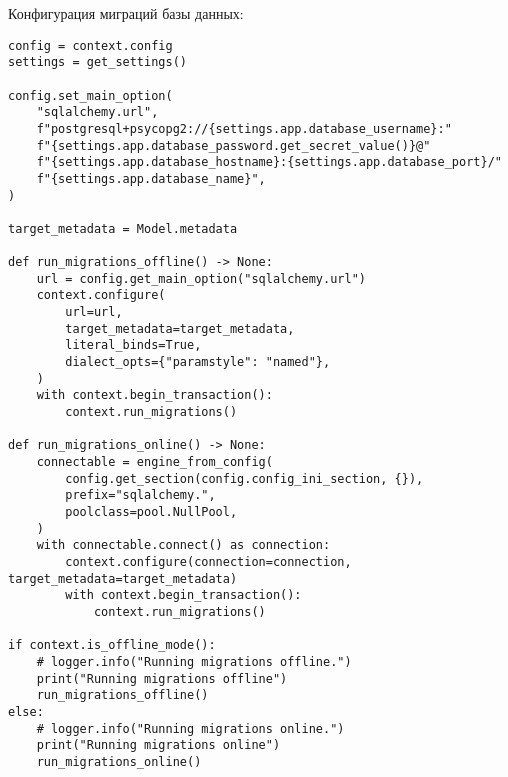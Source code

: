 \noindent
Конфигурация миграций базы данных:

\begin{lstlisting}[style=pythonstyle]
config = context.config
settings = get_settings()

config.set_main_option(
    "sqlalchemy.url",
    f"postgresql+psycopg2://{settings.app.database_username}:"
    f"{settings.app.database_password.get_secret_value()}@"
    f"{settings.app.database_hostname}:{settings.app.database_port}/"
    f"{settings.app.database_name}",
)

target_metadata = Model.metadata

def run_migrations_offline() -> None:
    url = config.get_main_option("sqlalchemy.url")
    context.configure(
        url=url,
        target_metadata=target_metadata,
        literal_binds=True,
        dialect_opts={"paramstyle": "named"},
    )
    with context.begin_transaction():
        context.run_migrations()

def run_migrations_online() -> None:
    connectable = engine_from_config(
        config.get_section(config.config_ini_section, {}),
        prefix="sqlalchemy.",
        poolclass=pool.NullPool,
    )
    with connectable.connect() as connection:
        context.configure(connection=connection, target_metadata=target_metadata)
        with context.begin_transaction():
            context.run_migrations()

if context.is_offline_mode():
    # logger.info("Running migrations offline.")
    print("Running migrations offline")
    run_migrations_offline()
else:
    # logger.info("Running migrations online.")
    print("Running migrations online")
    run_migrations_online()
\end{lstlisting}
